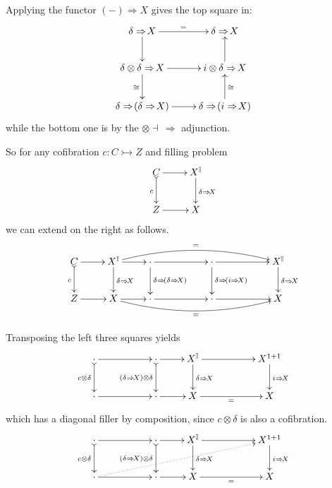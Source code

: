 \documentclass[12pt]{article}
\newcommand{\mono}{\ensuremath{\rightarrowtail}}
\newcommand{\II}{\ensuremath{\mathbb{I}}}
\theoremstyle{remark}
\theoremstyle{definition}
\begin{document}
Applying the functor $(-)\Rightarrow X$ gives the top square in:
\[
\xymatrix{
\delta \Rightarrow\!X \ar[d]  \ar[r]^= & \delta\Rightarrow\!X \\
\delta \otimes \delta\Rightarrow\!X  \ar[d]_\cong \ar[r] & i \otimes \delta\Rightarrow\!X   \ar[u] \\
\delta\Rightarrow\!(\delta\Rightarrow\!X)   \ar[r] & \delta\Rightarrow\!(i\Rightarrow\!X)  \ar[u]_\cong \\
}
\]
while the bottom one is by the $\otimes\dashv\,\Rightarrow$ adjunction.


So for any cofibration $c : C \mono Z$ and filling problem
\[
\xymatrix{
C \ar@{>->}[d]_c \ar[r] & X^\II \ar[d]^{\delta\Rightarrow\!X} \\
Z \ar[r] & X
}
\]
we can extend on the right as follows.
\[
\xymatrix{
C \ar@{>->}[d]_c \ar[r] & X^\II \ar[d]^{\delta\Rightarrow\!X}  \ar[r] \ar@/^1pc/[rrrrr]^{=} & \cdot \ar[d]^{\delta\Rightarrow\!(\delta\Rightarrow\!X)}  \ar[rr] 
	&& \cdot \ar[d]^{\delta\Rightarrow\!(i\Rightarrow\!X)}  \ar[rr]  && X^\II \ar[d]^{\delta\Rightarrow\!X}  \\
Z \ar[r] & X  \ar[r] \ar@/_1pc/[rrrrr]_{=} & \cdot  \ar[rr] && \cdot  \ar[rr] && X
}
\]

Transposing the left three squares yields
\[
\xymatrix{
\cdot \ar@{>->}[d]_{c\otimes \delta} \ar[rr] &&\cdot \ar@{>->}[d]_{(\delta\Rightarrow\!X)\otimes \delta} \ar[r] & X^\II \ar[d]^{\delta\Rightarrow\!X}  \ar[rr] && X^{1+1} \ar[d]^{i\Rightarrow\!X}   \\
\cdot \ar[rr] && \cdot \ar[r] & X  \ar[rr]_= && X  
}
\]
which has a diagonal filler by composition, since $c\otimes \delta$ is also a cofibration.
\[
\xymatrix{
\cdot \ar@{>->}[d]_{c\otimes \delta} \ar[rr] &&\cdot \ar@{>->}[d]_{(\delta\Rightarrow\!X)\otimes \delta} \ar[r] &  X^\II \ar[d]^{\delta\Rightarrow\!X}  \ar[rr] && X^{1+1} \ar[d]^{i\Rightarrow\!X}   \\
\cdot \ar[rr] \ar@{..>}[rrrrru]&& \cdot \ar[r] &  X  \ar[rr]_= && X  
}
\]
\end{document}
